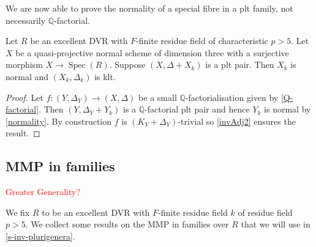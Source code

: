 \documentclass[a4paper,12pt]{book}
\DeclareMathOperator{\Spec}{Spec}
\newcommand\myworries[1]{\textcolor{red}{#1}}
\begin{document}
	We are now able to prove the normality of a special fibre in a plt family, not necessarily $\mathbb{Q}$-factorial.
	\begin{corollary}\label{invAdj3}
		Let $R$ be an excellent DVR with $F$-finite residue field of characteristic $p> 5$. Let $X$ be a quasi-projective normal scheme of dimension three with a surjective morphism $X \to \Spec(R)$. 
		Suppose $(X,\Delta+X_{k})$ is a plt pair. Then $X_{k}$ is normal and $(X_{k}, \Delta_{k})$ is klt.	
	\end{corollary}
	
	\begin{proof}
		Let $f\colon (Y,\Delta_{Y})\to (X,\Delta)$ be a small $\mathbb{Q}$-factorialisation given by \autoref{Q-factorial}. Then $(Y,\Delta_{Y}+Y_{k})$ is a $\mathbb{Q}$-factorial plt pair and hence $Y_{k}$ is normal by \autoref{normality}. By construction $f$ is $(K_{Y}+\Delta_{Y})$-trivial so \autoref{invAdj2} ensures the result.
	\end{proof}
	
	\subsection{MMP in families}\myworries{Greater Generality?}
	
	We fix $R$ to be an excellent DVR with $F$-finite residue field $k$ of residue field $p>5$.
	We collect some results on the MMP in families over $R$ that we will use in \autoref{s-inv-plurigenera}.
	
\end{document}
